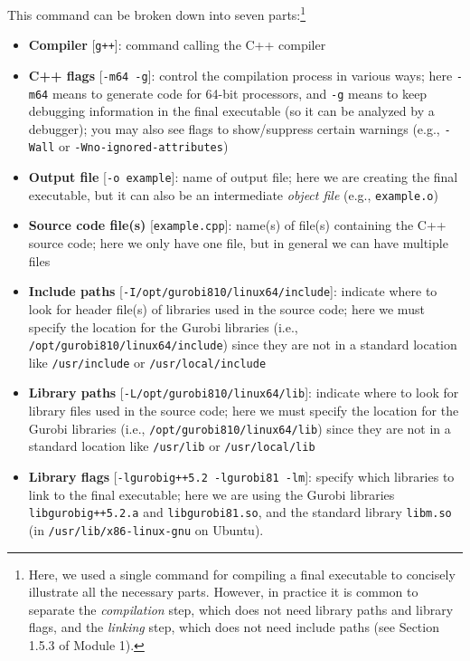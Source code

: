 \documentclass[12pt]{article}
\begin{document}
This command can be broken down into seven parts:\footnote{Here, we used a single command for compiling a final executable to concisely illustrate all the necessary parts. However, in practice it is common to separate the \emph{compilation} step, which does not need library paths and library flags, and the \emph{linking} step, which does not need include paths (see Section 1.5.3 of Module 1).}
\begin{itemize}
    \item \textbf{Compiler} [\texttt{g++}]: command calling the C++ compiler
    \item \textbf{C++ flags} [\texttt{-m64 -g}]: control the compilation process in various ways; here \texttt{-m64} means to generate code for 64-bit processors, and \texttt{-g} means to keep debugging information in the final executable (so it can be analyzed by a debugger); you may also see flags to show/suppress certain warnings (e.g., \texttt{-Wall} or \texttt{-Wno-ignored-attributes})
    \item \textbf{Output file} [\texttt{-o example}]: name of output file; here we are creating the final executable, but it can also be an intermediate \emph{object file} (e.g., \texttt{example.o})
    \item \textbf{Source code file(s)} [\texttt{example.cpp}]: name(s) of file(s) containing the C++ source code; here we only have one file, but in general we can have multiple files
    \item \textbf{Include paths} [\texttt{-I/opt/gurobi810/linux64/include}]: indicate where to look for header file(s) of libraries used in the source code; here we must specify the location for the Gurobi libraries (i.e., \texttt{/opt/gurobi810/linux64/include}) since they are not in a standard location like \texttt{/usr/include} or \texttt{/usr/local/include}
    \item \textbf{Library paths} [\texttt{-L/opt/gurobi810/linux64/lib}]: indicate where to look for library files used in the source code; here we must specify the location for the Gurobi libraries (i.e., \texttt{/opt/gurobi810/linux64/lib}) since they are not in a standard location like \texttt{/usr/lib} or \texttt{/usr/local/lib}
    \item \textbf{Library flags} [\texttt{-lgurobi\ttul g++5.2 -lgurobi81 -lm}]: specify which libraries to link to the final executable; here we are using the Gurobi libraries \texttt{libgurobi\ttul g++5.2.a} and \texttt{libgurobi81.so}, and the standard library \texttt{libm.so} (in \texttt{/usr/lib/x86-linux-gnu} on Ubuntu).
\end{itemize}
\end{document}
